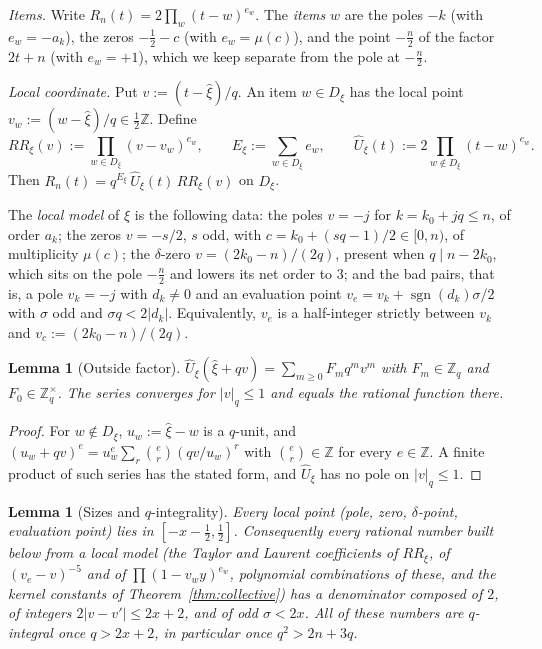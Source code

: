 \documentclass{amsart}
\newtheorem{lemma}[theorem]{Lemma}
\theoremstyle{definition}
\theoremstyle{remark}
\numberwithin{equation}{section}
\newcommand{\Z}{\mathbb{Z}}
\newcommand{\sgn}{\operatorname{sgn}}
\begin{document}
\emph{Items.} Write $R_n(t)=2\prod_w(t-w)^{e_w}$. The \emph{items} $w$ are the
poles $-k$ (with $e_w=-a_k$), the zeros $-\frac12-c$ (with $e_w=\mu(c)$), and
the point $-\frac n2$ of the factor $2t+n$ (with $e_w=+1$), which we keep
separate from the pole at $-\frac n2$.

\emph{Local coordinate.} Put $v:=(t-\hat\xi)/q$. An item $w\in D_\xi$ has the
local point $v_w:=(w-\hat\xi)/q\in\frac12\Z$. Define
\[
  RR_\xi(v):=\prod_{w\in D_\xi}(v-v_w)^{e_w},\qquad
  E_\xi:=\sum_{w\in D_\xi}e_w,\qquad
  \hat U_\xi(t):=2\prod_{w\notin D_\xi}(t-w)^{e_w}.
\]
Then $R_n(t)=q^{E_\xi}\,\hat U_\xi(t)\,RR_\xi(v)$ on $D_\xi$.

The \emph{local model} of $\xi$ is the following data: the poles $v=-j$ for
$k=k_0+jq\le n$, of order $a_k$; the zeros $v=-s/2$, $s$ odd, with
$c=k_0+(sq-1)/2\in[0,n)$, of multiplicity $\mu(c)$; the $\delta$-zero
$v=(2k_0-n)/(2q)$, present when $q\mid n-2k_0$, which sits on the pole
$-\frac n2$ and lowers its net order to $3$; and the bad pairs, that is, a
pole $v_k=-j$ with $d_k\ne0$ and an evaluation point
$v_e=v_k+\sgn(d_k)\sigma/2$ with $\sigma$ odd and $\sigma q<2|d_k|$.
Equivalently, $v_e$ is a half-integer strictly between $v_k$ and
$v_c:=(2k_0-n)/(2q)$.

\begin{lemma}[Outside factor]\label{lem:outside}
$\hat U_\xi(\hat\xi+qv)=\sum_{m\ge0}F_mq^mv^m$ with $F_m\in\Z_q$ and
$F_0\in\Z_q^\times$. The series converges for $|v|_q\le1$ and equals the
rational function there.
\end{lemma}

\begin{proof}
For $w\notin D_\xi$, $u_w:=\hat\xi-w$ is a $q$-unit, and
$(u_w+qv)^{e}=u_w^{e}\sum_r\binom er(qv/u_w)^r$ with $\binom er\in\Z$ for
every $e\in\Z$. A finite product of such series has the stated form, and
$\hat U_\xi$ has no pole on $|v|_q\le1$.
\end{proof}

\begin{lemma}[Sizes and $q$-integrality]\label{lem:sizes}
Every local point (pole, zero, $\delta$-point, evaluation point) lies in
$[-x-\frac12,\frac12]$. Consequently every rational number built below from a
local model (the Taylor and Laurent coefficients of $RR_\xi$, of
$(v_e-v)^{-5}$ and of $\prod(1-v_wy)^{e_w}$, polynomial combinations of
these, and the kernel constants of Theorem~\ref{thm:collective}) has a
denominator composed of $2$, of integers $2|v-v'|\le2x+2$, and of odd
$\sigma<2x$. All of these numbers are $q$-integral once $q>2x+2$, in particular
once $q^2>2n+3q$.
\end{lemma}
\end{document}
